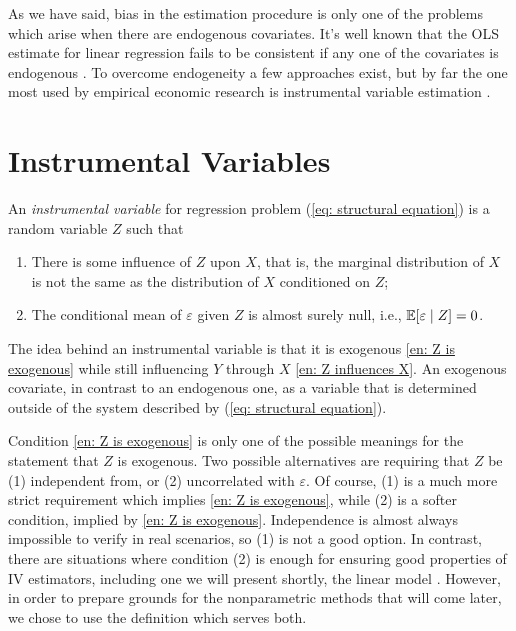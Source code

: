 As we have said, bias in the estimation procedure is only one of the problems which arise when there are endogenous covariates.
It's well known that the OLS estimate for linear regression fails to be consistent if any one of the covariates is endogenous \cite{wooldridge2001}.
To overcome endogeneity a few approaches exist, but by far the one most used by empirical economic research is instrumental variable estimation \cite{wooldridge2001}.

\section{Instrumental Variables}

\begin{deff}
    \label{def: iv}
    An \emph{instrumental variable} for regression problem (\ref{eq: structural equation}) is a random variable $ Z $ such that
    \begin{enumerate}
        \item There is some influence of $ Z $ upon $ X $, that is, the marginal distribution of $ X $ is not the same as the distribution of $ X $ conditioned on $ Z $; \label{en: Z influences X}
        \item The conditional mean of $ \varepsilon $ given $ Z $ is almost surely null, i.e., $ \mathbb{E} [ \varepsilon \mid Z ] = 0 $. \label{en: Z is exogenous}
    \end{enumerate}
\end{deff}


The idea behind an instrumental variable is that it is exogenous \ref{en: Z is exogenous} while still influencing $ Y $ through $ X $ \ref{en: Z influences X}.
An exogenous covariate, in contrast to an endogenous one, as a variable that is determined outside of the system described by (\ref{eq: structural equation}).

Condition \ref{en: Z is exogenous} is only one of the possible meanings for the statement that $ Z $ is exogenous.
Two possible alternatives are requiring that $ Z $ be (1) independent from, or (2) uncorrelated with $ \varepsilon $.
Of course, (1) is a much more strict requirement which implies \ref{en: Z is exogenous}, while (2) is a softer condition, implied by \ref{en: Z is exogenous}.
Independence is almost always impossible to verify in real scenarios, so (1) is not a good option.
In contrast, there are situations where condition (2) is enough for ensuring good properties of IV estimators, including one we will present shortly, the linear model \cite{wooldridge2001}.
However, in order to prepare grounds for the nonparametric methods that will come later, we chose to use the definition which serves both.

